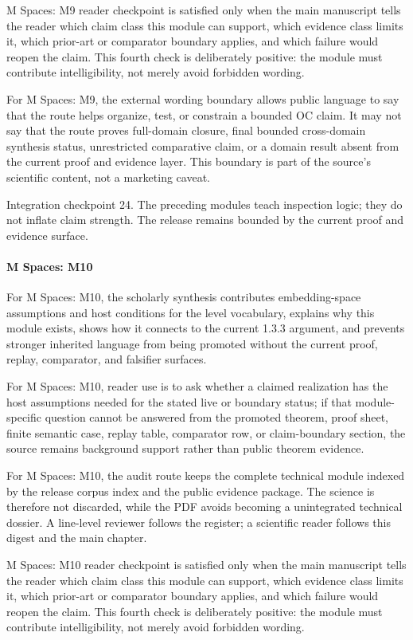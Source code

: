 M Spaces: M9 reader checkpoint is satisfied only when the main manuscript tells the reader which claim class this module can support, which evidence class limits it, which prior-art or comparator boundary applies, and which failure would reopen the claim. This fourth check is deliberately positive: the module must contribute intelligibility, not merely avoid forbidden wording.


For M Spaces: M9, the external wording boundary allows public language to say that the route helps organize, test, or constrain a bounded OC claim. It may not say that the route proves full-domain closure, final bounded cross-domain synthesis status, unrestricted comparative claim, or a domain result absent from the current proof and evidence layer. This boundary is part of the source's scientific content, not a marketing caveat.


Integration checkpoint 24. The preceding modules teach inspection logic; they do not inflate claim strength. The release remains bounded by the current proof and evidence surface.


\paragraph{M Spaces: M10}

For M Spaces: M10, the scholarly synthesis contributes embedding-space assumptions and host conditions for the level vocabulary, explains why this module exists, shows how it connects to the current 1.3.3 argument, and prevents stronger inherited language from being promoted without the current proof, replay, comparator, and falsifier surfaces.


For M Spaces: M10, reader use is to ask whether a claimed realization has the host assumptions needed for the stated live or boundary status; if that module-specific question cannot be answered from the promoted theorem, proof sheet, finite semantic case, replay table, comparator row, or claim-boundary section, the source remains background support rather than public theorem evidence.


For M Spaces: M10, the audit route keeps the complete technical module indexed by the release corpus index and the public evidence package. The science is therefore not discarded, while the PDF avoids becoming a unintegrated technical dossier. A line-level reviewer follows the register; a scientific reader follows this digest and the main chapter.


M Spaces: M10 reader checkpoint is satisfied only when the main manuscript tells the reader which claim class this module can support, which evidence class limits it, which prior-art or comparator boundary applies, and which failure would reopen the claim. This fourth check is deliberately positive: the module must contribute intelligibility, not merely avoid forbidden wording.


